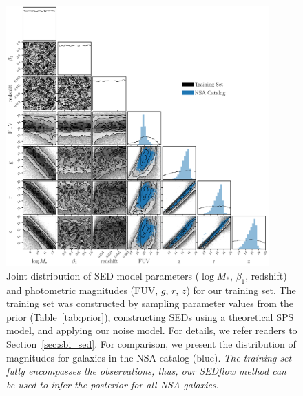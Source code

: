 \begin{figure}
\begin{center}
\includegraphics[width=0.9\textwidth]{figs/sbi.pdf}
    \caption{\label{fig:sbi}
    Joint distribution of SED model parameters ($\log M_*$, $\beta_1$,
    redshift) and photometric magnitudes (FUV, $g$, $r$, $z$) for our training
    set. 
    The training set was constructed by sampling parameter values from the
    prior (Table~\ref{tab:prior}), constructing SEDs using a theoretical SPS
    model, and applying our noise model. 
    For details, we refer readers to Section~\ref{sec:sbi_sed}.
    For comparison, we present the distribution of magnitudes for galaxies in
    the NSA catalog (blue). 
    \emph{The training set fully encompasses the observations, thus, our 
    {\sc SEDflow} method can be used to infer the posterior for all NSA
    galaxies}.
    }
\end{center}
\end{figure}


